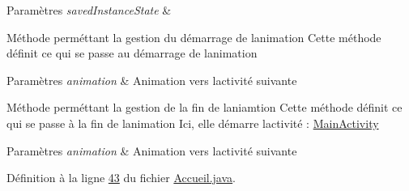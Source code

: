 \begin{DoxyParams}{Paramètres}
{\em saved\+Instance\+State} & \\
\hline
\end{DoxyParams}
Méthode perméttant la gestion du démarrage de l\textquotesingle{}animation Cette méthode définit ce qui se passe au démarrage de l\textquotesingle{}animation 
\begin{DoxyParams}{Paramètres}
{\em animation} & Animation vers l\textquotesingle{}activité suivante\\
\hline
\end{DoxyParams}
Méthode perméttant la gestion de la fin de l\textquotesingle{}aniamtion Cette méthode définit ce qui se passe à la fin de l\textquotesingle{}animation Ici, elle démarre l\textquotesingle{}activité \+: \hyperlink{classcom_1_1lasalle_1_1io__trucks_1_1_main_activity}{Main\+Activity} 
\begin{DoxyParams}{Paramètres}
{\em animation} & Animation vers l\textquotesingle{}activité suivante\\
\hline
\end{DoxyParams}


Définition à la ligne \hyperlink{_accueil_8java_source_l00043}{43} du fichier \hyperlink{_accueil_8java_source}{Accueil.\+java}.



